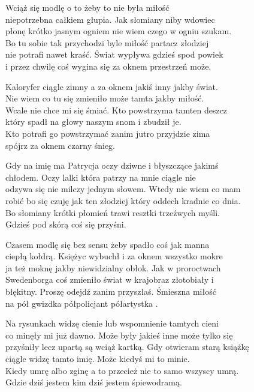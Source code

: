 \begin{text}
    \footnotesize{
    Wciąż się modlę o to żeby to nie była miłość\\
    niepotrzebna całkiem głupia. Jak słomiany niby wdowiec\\
    płonę krótko jasnym ogniem nie wiem czego w ogniu szukam.\\
    Bo tu sobie tak przychodzi byle miłość partacz złodziej\\
    nie potrafi nawet kraść. Świat wypływa gdzieś spod powiek\\
    i przez chwilę coś wygina się za oknem przestrzeń może.

    Kaloryfer ciągle zimny a za oknem jakiś inny jakby świat.\\
    Nie wiem co tu się zmieniło może tamta jakby miłość.\\
    Wcale nie chce mi się śmiać. Kto powstrzyma tamten deszcz\\
    który spadł na głowy naszym snom i zbudził je.\\
    Kto potrafi go powstrzymać zanim jutro przyjdzie zima\\
    spójrz za oknem czarny śnieg.

    Gdy na imię ma Patrycja oczy dziwne i błyszczące jakimś\\
    chłodem. Oczy lalki która patrzy na mnie ciągle nie\\
    odzywa się nie milczy jednym słowem. Wtedy nie wiem co mam\\
    robić bo się czuję jak ten złodziej który oddech kradnie co dnia.\\
    Bo słomiany krótki płomień trawi resztki trzeźwych myśli.\\
    Gdzieś pod skórą coś się przyśni.

    Czasem modlę się bez sensu żeby spadło coś jak manna\\
    ciepłą kołdrą. Księżyc wybuchł i za oknem wszystko mokre\\
    ja też moknę jakby niewidzialny obłok. Jak w proroctwach\\
    Swedenborga coś zmieniło świat w krajobraz złotobiały i\\
    błękitny. Proszę odejdź zanim przyszłaś. Śmieszna miłość\\
    na pół gwizdka półpolicjant półartystka .

    Na rysunkach widzę cienie lub wspomnienie tamtych cieni\\
    co minęły mi już dawno. Może były jakieś inne może tylko się\\
    przyśniły lecz upartą są wciąż kartką. Gdy otwieram starą książkę\\
    ciągle widzę tamto imię. Może kiedyś mi to minie.\\
    Kiedy umrę albo zginę a to przecież nie to samo wszyscy umrą.\\
    Gdzie dziś jestem kim dziś jestem śpiewodramą.

}
\end{text}
